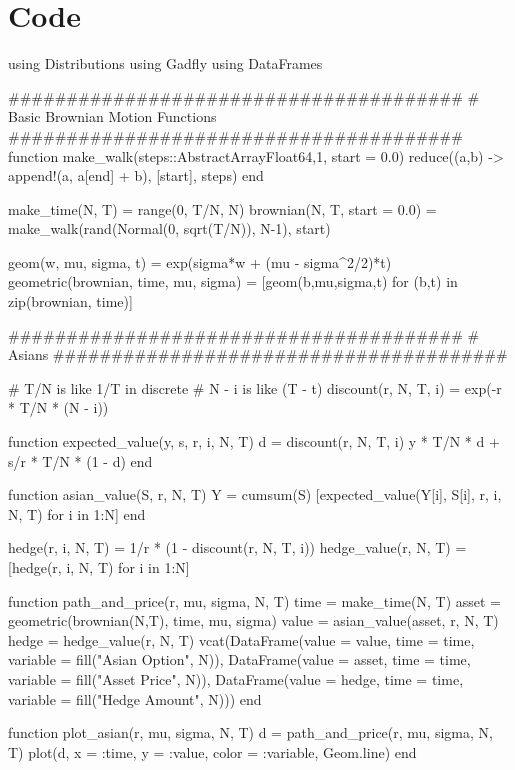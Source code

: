 \documentclass[a4paper,12pt]{article}
\begin{document}
\section{Code}

\begin{juliacode}
using Distributions
using Gadfly
using DataFrames

#######################################
# Basic Brownian Motion Functions
#######################################
function make_walk(steps::AbstractArray{Float64,1}, start = 0.0)
    reduce((a,b) -> append!(a, a[end] + b), [start], steps)
end

make_time(N, T) = range(0, T/N, N)
brownian(N, T, start = 0.0) = make_walk(rand(Normal(0, sqrt(T/N)), N-1), start)

geom(w, mu, sigma, t) = exp(sigma*w + (mu - sigma^2/2)*t)
geometric(brownian, time, mu, sigma) = [geom(b,mu,sigma,t) for (b,t) in zip(brownian, time)]

#######################################
# Asians
#######################################

# T/N is like 1/T in discrete
# N - i is like (T - t)
discount(r, N, T, i) = exp(-r * T/N * (N - i))

function expected_value(y, s, r, i, N, T)
    d = discount(r, N, T, i)
    y * T/N * d + s/r * T/N * (1 - d)
end

function asian_value(S, r, N, T)
    Y = cumsum(S)
    [expected_value(Y[i], S[i], r, i, N, T) for i in 1:N]
end

hedge(r, i, N, T) = 1/r * (1 - discount(r, N, T, i))
hedge_value(r, N, T) = [hedge(r, i, N, T) for i in 1:N]

function path_and_price(r, mu, sigma, N, T)
    time = make_time(N, T)
    asset = geometric(brownian(N,T), time, mu, sigma)
    value = asian_value(asset, r, N, T)
    hedge = hedge_value(r, N, T)
    vcat(DataFrame(value = value, time = time, variable = fill("Asian Option", N)),
         DataFrame(value = asset, time = time, variable = fill("Asset Price", N)),
         DataFrame(value = hedge, time = time, variable = fill("Hedge Amount", N)))
end

function plot_asian(r, mu, sigma, N, T)
    d = path_and_price(r, mu, sigma, N, T)
    plot(d, x = :time, y = :value, color = :variable, Geom.line)
end
\end{juliacode}
\end{document}
